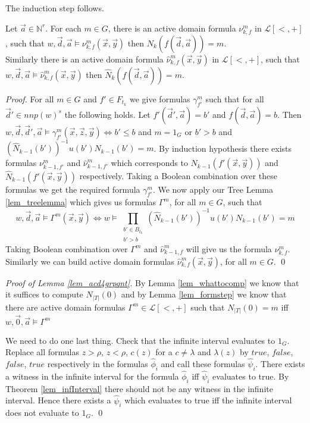 \documentclass[envcountsame]{llncs}
\newcommand{\Nat}{\mathbb{N}}
\begin{document}
The induction step follows.
\begin{lemma}\label{lem_formstep}
  Let $\vec a \in \Nat^r$. For each $m \in G$, there is an active domain formula $\nu^m_{k,f}$ in $\mathcal L[<,+]$,
such that $w,\vec d, \vec a \models\nu^m_{k,f}(\vec x,\vec y)$ then $N_k(f(\vec d,\vec a))=m$. \\
Similarly there is an active domain formula $\hat \nu^m_{k,f}(\vec x,\vec y)$ in $\mathcal L[<,+]$,
such that $w,\vec d, \vec a \models\hat \nu^m_{k,f}(\vec x,\vec y)$ then
$\hat N_k(f(\vec d, \vec a))=m$.
\end{lemma}
\begin{proof}
  For all $m \in G$ and $f' \in F_{t_k}$ we give formulas $\gamma_{f'}^m$ such that for all $\vec d' \in nnp(w)^s$ the
  following holds. Let $f'(\vec d', \vec a)=b'$ and $f(\vec d,\vec a)=b$. Then 
  $w, \vec d, \vec d',\vec a \models \gamma_{f'}^m(\vec x, \vec z,\vec y) \Leftrightarrow b' \leq b$  and  $m = 1_G$
  or  $b' > b$  and $\left(\hat N_{k-1}(b')\right)^{-1} u(b') N_{k-1}(b') = m$.
  By induction hypothesis there exists formulas $\nu^m_{k-1,f'}$ and $\hat \nu^m_{k-1,f'}$ which corresponds to $N_{k-1}(f'(\vec x,\vec y))$
  and $\hat N_{k-1}(f'(\vec x,\vec y))$ respectively. Taking a Boolean combination over these formulas we get the required formula $\gamma_{f'}^m$.
  We now apply our Tree Lemma \ref{lem_treelemma} which gives us formulas $\Gamma^m$, 
  for all $m \in G$, such that 
  $$w,\vec d,\vec a \models \Gamma^{m}(\vec x,\vec y) \Leftrightarrow
  w \models \prod_{\substack{b'\in B_{t_k}\\b'>b}} \left(\hat N_{k-1}(b')\right)^{-1} u(b') N_{k-1}(b') = m$$ 
  Taking Boolean combination over $\Gamma^m$ and $\hat \nu^m_{k-1,f}$ will give us the formula $\nu^m_{k,f}$.
Similarly we can build active domain formulas $\hat \nu^m_{k,f}(\vec x,\vec y)$, for all $m \in G$.
\qed \end{proof}

\begin{proof}[Proof of Lemma \ref{lem_acd4grpqnt}] 
By Lemma \ref{lem_whattocomp} we know that it suffices to compute $N_{|T|}(0)$ and by Lemma \ref{lem_formstep} we know that there are
active domain formulas $\Gamma^m \in \mathcal L[<,+]$ such that $N_{|T|}(0) = m$ iff $w,\vec 0,\vec a \models \Gamma^m$

We need to do one last thing. Check that the infinite interval evaluates to $1_G$. Replace all formulas $z>\rho$, $z<\rho$, $c(z)$ for
a $c \neq \lambda$ and $\lambda(z)$ by $true$, $false$, $false$, $true$ respectively in the formulas $\hat \phi_i$ and call these formulas $\hat\psi_i$. 
There exists a witness in the infinite interval for the formula $\hat \phi_i$ iff $\hat \psi_i$ evaluates to true. 
By Theorem \ref{lem_infInterval} there should not be any witness in the infinite interval. Hence there exists a $\hat \psi_i$ which
evaluates to true iff the infinite interval does not evaluate to $1_G$.
\qed \end{proof}
\end{document}
